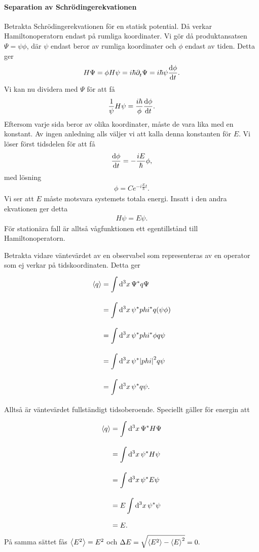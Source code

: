 \paragraph{Separation av Schrödingerekvationen}
Betrakta Schrödingerekvationen för en statisk potential. Då verkar Hamiltonoperatorn endast på rumliga koordinater. Vi gör då produktansatsen $\Psi = \psi\phi$, där $\psi$ endast beror av rumliga koordinater och $\phi$ endast av tiden. Detta ger
\begin{align*}
	H\Psi = \phi H\psi = i\hbar\partial_{t}^{}\Psi = i\hbar \psi\dv{\phi}{t}.
\end{align*}
Vi kan nu dividera med $\Psi$ för att få
\begin{align*}
	\frac{1}{\psi}H\psi = \frac{i\hbar}{\phi}\dv{\phi}{t}.
\end{align*}
Eftersom varje sida beror av olika koordinater, måste de vara lika med en konstant. Av ingen anledning alls väljer vi att kalla denna konstanten för $E$. Vi löser först tidsdelen för att få
\begin{align*}
	\dv{\phi}{t} = -\frac{iE}{\hbar}\phi,
\end{align*}
med lösning
\begin{align*}
	\phi = Ce^{-i\frac{E}{\hbar}t}.
\end{align*}
Vi ser att $E$ måste motsvara systemets totala energi. Insatt i den andra ekvationen ger detta
\begin{align*}
	H\psi = E\psi.
\end{align*}
För stationära fall är alltså vågfunktionen ett egentillstånd till Hamiltonoperatorn.

Betrakta vidare väntevärdet av en observabel som representeras av en operator som ej verkar på tidskoordinaten. Detta ger
\begin{align*}
	\expval{q} &= \int\limits_{}^{}\dd[3]{x}\Psi^{*}q\Psi \\
	           &= \int\limits_{}^{}\dd[3]{x}\psi^{*}phi^{*}q(\psi\phi) \\
	           &= \int\limits_{}^{}\dd[3]{x}\psi^{*}phi^{*}\phi q\psi \\
	           &= \int\limits_{}^{}\dd[3]{x}\psi^{*}\abs{phi}^{2} q\psi \\
	           &= \int\limits_{}^{}\dd[3]{x}\psi^{*} q\psi.
\end{align*}
Alltså är väntevärdet fullständigt tidsoberoende. Speciellt gäller för energin att
\begin{align*}
	\expval{q} &= \int\limits_{}^{}\dd[3]{x}\Psi^{*} H\Psi \\
	           &= \int\limits_{}^{}\dd[3]{x}\psi^{*} H\psi \\
	           &= \int\limits_{}^{}\dd[3]{x}\psi^{*} E\psi \\
	           &= E\int\limits_{}^{}\dd[3]{x}\psi^{*}\psi \\
	           &= E.
\end{align*}
På samma sättet fås $\expval{E^{2}} = E^{2}$ och $\Delta E = \sqrt{\expval{E^{2}} - \expval{E}^{2}} = 0.$

